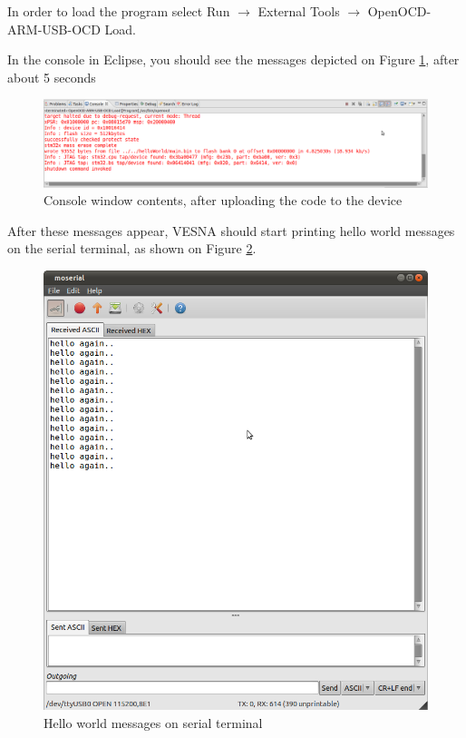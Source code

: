 \documentclass[a4paper, 10pt]{article}
\begin{document}
In order to load the program select
Run $\rightarrow$ External Tools $\rightarrow$ OpenOCD-ARM-USB-OCD Load.

In the console in Eclipse, you should see the messages depicted on
Figure \ref{fig:load-successful},
after about 5 seconds


    \begin{figure}[H]
    \centering
        \includegraphics[width=\textwidth]{./install-guide-linux-images/load-successful.png}
        \caption{Console window contents, after uploading the code to the device}
        \label{fig:load-successful}
    \end{figure}

After these messages appear, VESNA should start printing hello world messages
on the serial terminal, as shown on Figure \ref{fig:hello-world}.

    \begin{figure}[H]
    \centering
        \includegraphics[width=\textwidth]{./install-guide-linux-images/hello-world-moserial.png}
        \caption{Hello world messages on serial terminal}
        \label{fig:hello-world}
    \end{figure}
\end{document}
